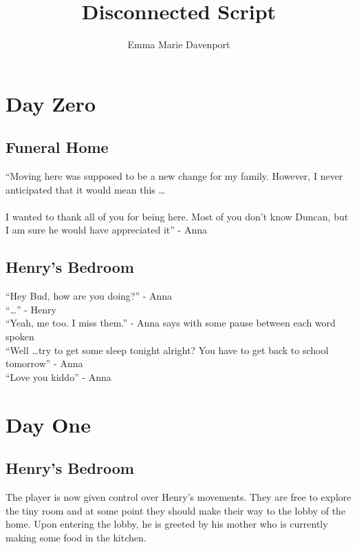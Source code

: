 \documentclass[12pt, a4paper, titlepage]{article}
\author{Emma Marie Davenport}
\title{Disconnected Script}
\begin{document}
    \maketitle
    
    \section{Day Zero}

        \subsection{Funeral Home}

            ``Moving here was supposed to be a new change for my family. 
            However, I never anticipated that it would mean this \ldots\\~\\
	    I wanted to thank all of you for being here. Most of you
            don't know Duncan, but I am sure he would have appreciated it'' - Anna

        \subsection{Henry's Bedroom}

            ``Hey Bud, how are you doing?'' - Anna\\
            ``\ldots'' - Henry\\
            ``Yeah, me too. I miss them.'' - Anna says with some pause between each word spoken\\
            ``Well \ldots try to get some sleep tonight alright? You have to get back to school tomorrow'' - Anna\\
            ``Love you kiddo'' - Anna\\
            
	\section{Day One}

        \subsection{Henry's Bedroom}

            The player is now given control over Henry's movements. They are free to explore the tiny room and at some point
            they should make their way to the lobby of the home. Upon entering the lobby, he is greeted by his mother who is
            currently making some food in the kitchen.
\end{document}
